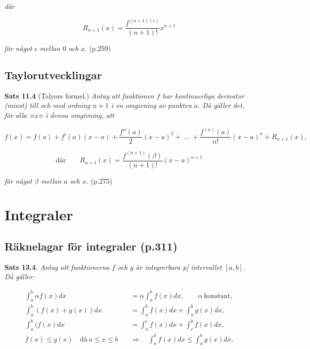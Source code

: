 \documentclass[11pt]{article}
\begin{document}
\textit{där}


\begin{equation}
    R_{n + 1}(x) = \frac{f^{(n + 1)(\epsilon)}}{(n +  1)!}x^{n + 1}
    \label{eq:maclaurinpolynom_rest}
\end{equation}

\textit{för något $\epsilon$ mellan $0$ och $x$}. (p.259)

\subsection{Taylorutvecklingar}

\textbf{Sats 11.4} (Talyors formel.) \textit{Antag att funktionen $f$ har kontinuerliga derivator (minst) till och med ordning $n + 1$ i en omgivning av punkten $a$. Då gäller det, för alla ¤x¤ i denna omgivning, att}

\begin{equation}
    f(x) = f(a) + f'(a)(x - a) + \frac{f''(a)}{2}(x - a)^2 +\ ...\ + \frac{f^{(n)}(a)}{n!}(x - a)^n + R_{n + 1}(x),
\end{equation}

\begin{equation}
    \text{där}\qquad R_{n + 1}(x) = \frac{f^{(n + 1)}(\beta)}{(n + 1)!}(x - a)^{n + 1}
\end{equation}

\textit{för något $\beta$ mellan $a$ och $x$.} (p.275)

\section{Integraler}

\subsection{Räknelagar för integraler (p.311)}

\textbf{Sats 13.4}. \textit{Antag att funktionerna $f$ och $g$ är integrerbara p[ intervallet $[a, b]$. Då gäller:}

\begin{align}
    \int_a^b{\alpha f(x)} dx &= \alpha \int_a^b{f(x)} dx, \qquad \alpha\ \text{konstant},\\
    \int_a^b{(f(x) + g(x))} dx &= \int_a^b{f(x)} dx + \int_a^b{g(x)} dx,\\
    \int_a^b{(f(x)} dx &= \int_a^c{f(x)} dx + \int_c^b{f(x)} dx,\\
    f(x) \leq g(x) \quad \text{då}\ a \leq x \leq b \quad &\Rightarrow \quad \int_a^b{f(x)} dx \leq \int_a^b{g(x)} dx.
\end{align}
\end{document}
